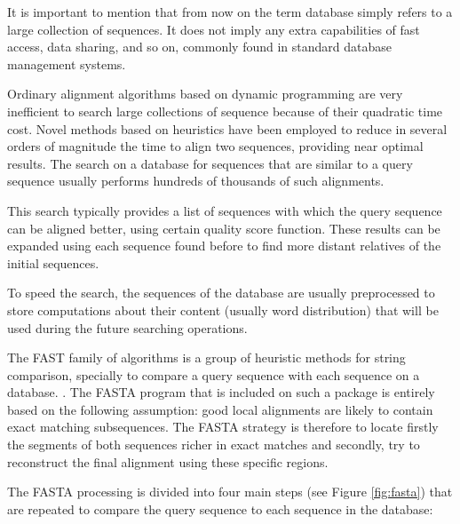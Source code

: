It is important to mention that from now on the term database simply refers to a large collection of 
sequences. It does not imply any extra capabilities of fast access, data sharing, and so on, commonly 
found in standard database management systems.

Ordinary alignment algorithms based on dynamic programming are very inefficient to search large 
collections of sequence because of their quadratic time cost. Novel methods based on heuristics have 
been employed to reduce in several orders of magnitude the time to align two sequences, providing near 
optimal results. The search on a database for sequences that are similar to a query sequence usually 
performs hundreds of thousands of such alignments. 

This search typically provides a list of sequences with which the query sequence can be aligned better, 
using certain quality score function. These results can be expanded using each sequence found before to 
find more distant relatives of the initial sequences. 

To speed the search, the sequences of the database are usually preprocessed to store computations
about their content (usually word distribution) that will be used during the future searching 
operations.


  
The FAST family of algorithms is a group of heuristic methods for string comparison, specially
to compare a query sequence with each sequence on a database. \citep{lipman:1985a,pearson:1988a}. The 
FASTA program that is included on such a package is entirely based on the following assumption: good local 
alignments are likely to contain exact matching subsequences. The FASTA strategy is therefore to locate 
firstly the segments of both sequences richer in exact matches and secondly, try to reconstruct the 
final alignment using these specific regions.

The FASTA processing is divided into four main steps (see Figure \ref{fig:fasta}) that are repeated 
to compare the query sequence to each sequence in the database:

